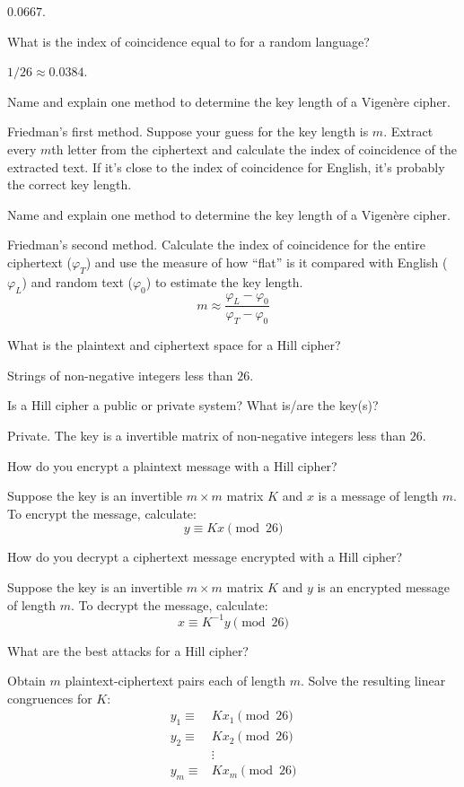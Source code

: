 \documentclass{article}
\newcounter{qcounter}
\newcommand{\showqcounter}{\theqcounter}
\newcommand{\question}{\vspace{5mm}\addtocounter{qcounter}{1}\vspace{5mm}{\bf Q\showqcounter: }}
\newcommand{\answer}{\vspace{5mm}{\bf A\showqcounter: }}
\begin{document}
\answer $0.0667$.


\question What is the index of coincidence equal to for a random language?

\answer $1 / 26 \approx 0.0384$.


\question Name and explain one method to determine the key length of a Vigen\`ere cipher.

\answer Friedman's first method. Suppose your guess for the key length is $m$. Extract every $m$th letter from the ciphertext 
  and calculate the index of coincidence of the extracted text. 
  If it's close to the index of coincidence for English, it's probably the correct key length.


\question Name and explain one method to determine the key length of a Vigen\`ere cipher.

\answer Friedman's second method. Calculate the index of coincidence for the entire ciphertext ($\varphi_T$) and use the measure 
  of how ``flat'' is it compared with English ($\varphi_L$) and random text ($\varphi_0$) to estimate the key length.
  $$
    m \approx \frac{\varphi_L - \varphi_0}{\varphi_T - \varphi_0}
  $$


\question What is the plaintext and ciphertext space for a Hill cipher?

\answer Strings of non-negative integers less than $26$.


\question Is a Hill cipher a public or private system? What is/are the key(s)?

\answer Private. The key is a invertible matrix of non-negative integers less than $26$.


\question How do you encrypt a plaintext message with a Hill cipher?

\answer Suppose the key is an invertible $m \times m$ matrix $K$ and $x$ is a message of length $m$. 
  To encrypt the message, calculate:
  $$
    y \equiv K x \pmod{26}
  $$


\question How do you decrypt a ciphertext message encrypted with a Hill cipher?

\answer Suppose the key is an invertible $m \times m$ matrix $K$ and $y$ is an encrypted message of length $m$. 
To decrypt the message, calculate:
$$
  x \equiv K^{-1} y \pmod{26}
$$


\question What are the best attacks for a Hill cipher?

\answer Obtain $m$ plaintext-ciphertext pairs each of length $m$.
  Solve the resulting linear congruences for $K$:
  \begin{align*}
    y_1 \equiv& K x_1 \pmod{26}\\
    y_2 \equiv& K x_2 \pmod{26}\\
              & \vdots\\
    y_m \equiv& K x_m \pmod{26}
  \end{align*}
\end{document}
